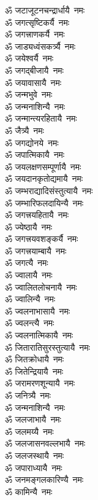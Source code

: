 \begin{flushleft}
\begin{multicols}{2}
ॐ जटाजूटनचन्द्रार्धायै~नमः\\
ॐ जगत्सृष्टिकर्यै~नमः\\
ॐ जगत्त्राणकर्यै~नमः\\
ॐ जाड्यध्वंसकर्त्र्यै~नमः\hfill{}\\
ॐ जयेश्वर्यै~नमः\\
ॐ जगद्बीजायै~नमः\\
ॐ जयावासायै~नमः\\
ॐ जन्मभुवे~नमः\\
ॐ जन्मनाशिन्यै~नमः\\
ॐ जन्मान्त्यरहितायै~नमः\\
ॐ जैत्र्यै~नमः\\
ॐ जगद्योनये~नमः\\
ॐ जपात्मिकायै~नमः\\
ॐ जयलक्षणसम्पूर्णायै~नमः\hfill{}\\
ॐ जयदानकृतोद्यमायै~नमः\\
ॐ जम्भराद्यादिसंस्तुत्यायै~नमः\\
ॐ जम्भारिफलदायिन्यै~नमः\\
ॐ जगत्त्रयहितायै~नमः\\
ॐ ज्येष्ठायै~नमः\\
ॐ जगत्त्रयवशङ्कर्यै~नमः\\
ॐ जगत्त्रयाम्बायै~नमः\\
ॐ जगत्यै~नमः\\
ॐ ज्वालायै~नमः\\
ॐ ज्वालितलोचनायै~नमः\hfill{}\\
ॐ ज्वालिन्यै~नमः\\
ॐ ज्वलनाभासायै~नमः\\
ॐ ज्वलन्त्यै~नमः\\
ॐ ज्वलनात्मिकायै~नमः\\
ॐ जितारातिसुरस्तुत्यायै~नमः\\
ॐ जितक्रोधायै~नमः\\
ॐ जितेन्द्रियायै~नमः\\
ॐ जरामरणशून्यायै~नमः\\
ॐ जनित्र्यै~नमः\\
ॐ जन्मनाशिन्यै~नमः\hfill{}\\
ॐ जलजाभायै~नमः\\
ॐ जलमय्यै~नमः\\
ॐ जलजासनवल्लभायै~नमः\\
ॐ जलजस्थायै~नमः\\
ॐ जपाराध्यायै~नमः\\
ॐ जनमङ्गलकारिण्यै~नमः\\
ॐ कामिन्यै~नमः\\

\end{multicols}
\end{flushleft}
